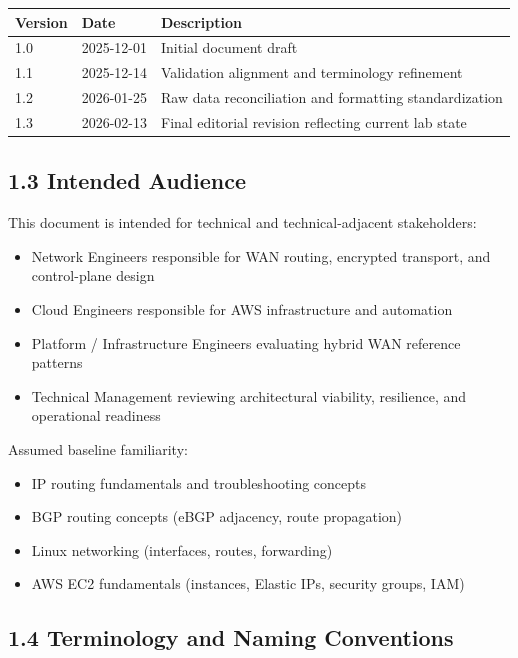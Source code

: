 \documentclass[11pt]{article}
\begin{document}
\begin{tabular}{|l|l|l|}
\hline
\textbf{Version} & \textbf{Date} & \textbf{Description} \\
\hline
1.0 & 2025-12-01 & Initial document draft \\
\hline
1.1 & 2025-12-14 & Validation alignment and terminology refinement \\
\hline
1.2 & 2026-01-25 & Raw data reconciliation and formatting standardization \\
\hline
1.3 & 2026-02-13 & Final editorial revision reflecting current lab state \\
\hline
\end{tabular}

\subsection{1.3 Intended Audience}
\label{sec:intended-audience}

This document is intended for technical and technical-adjacent stakeholders:

\begin{itemize}
  \item Network Engineers responsible for WAN routing, encrypted transport, and control-plane design
  \item Cloud Engineers responsible for AWS infrastructure and automation
  \item Platform / Infrastructure Engineers evaluating hybrid WAN reference patterns
  \item Technical Management reviewing architectural viability, resilience, and operational readiness
\end{itemize}

Assumed baseline familiarity:

\begin{itemize}
  \item IP routing fundamentals and troubleshooting concepts
  \item BGP routing concepts (eBGP adjacency, route propagation)
  \item Linux networking (interfaces, routes, forwarding)
  \item AWS EC2 fundamentals (instances, Elastic IPs, security groups, IAM)
\end{itemize}

\subsection{1.4 Terminology and Naming Conventions}
\label{sec:terminology}
\end{document}
